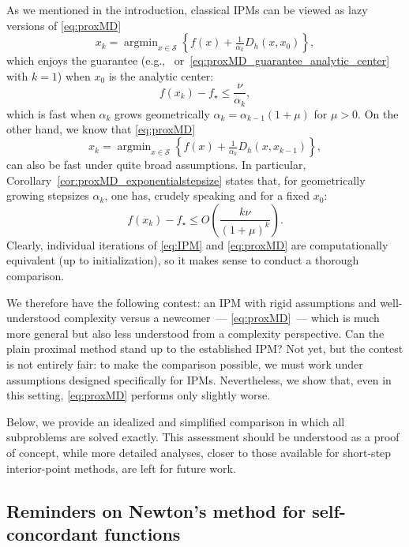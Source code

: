 \documentclass[a4paper]{article}
\renewcommand{\leq}{\leqslant}
\renewcommand{\SS}{\mathcal{S}}
\DeclareMathOperator*{\argmin}{argmin}
\begin{document}
As we mentioned in the introduction, classical IPMs can be viewed as lazy versions of \eqref{eq:proxMD}
\begin{equation}\tag{IPM}
x_{k} = \argmin_{x\in\SS}\left\{ f(x) + \tfrac{1}{\alpha_k} D_{h}(x,x_0)\right\},
\end{equation}
which enjoys the guarantee (e.g.,~\cite[Theorem 5.3.10]{nesterov2018lectures} or~\eqref{eq:proxMD_guarantee_analytic_center} with $k=1$) when $x_0$ is the analytic center:
\[f(x_k)-f_\star \leq \frac{\nu}{\alpha_k},\]
which is fast when $\alpha_k$ grows geometrically $\alpha_k = \alpha_{k-1}(1+\mu)$ for $\mu>0$.
On the other hand, we  know that \eqref{eq:proxMD} 
\begin{equation}\tag{proxMD}
x_{k} = \argmin_{x\in\SS}\left\{ f(x) + \tfrac{1}{\alpha_k} D_{h}(x,x_{k-1})\right\},
\end{equation}
can also be fast under quite broad assumptions. In particular,
Corollary~\ref{cor:proxMD_exponentialstepsize} states that, for geometrically growing
stepsizes $\alpha_k$, one has, crudely speaking and for a fixed $x_0$:
\begin{equation*}
        f(x_k)-f_\star \leq O\left(\frac{k \nu}{(1+\mu)^k}\right).
\end{equation*}
Clearly, individual iterations of \eqref{eq:IPM} and \eqref{eq:proxMD} are computationally equivalent (up to initialization), so it makes sense to conduct a thorough  comparison. 

We therefore have the following contest: an IPM with rigid assumptions and well-understood complexity versus a newcomer~--- \eqref{eq:proxMD}~--- which is much more general but also less understood from a complexity perspective. Can the plain proximal method stand up to the established IPM? Not yet, but the contest is not entirely fair: to make the comparison possible, we must work under assumptions designed specifically for IPMs. Nevertheless, we show that, even in this setting, \eqref{eq:proxMD} performs only slightly worse.

Below, we provide an idealized and simplified comparison in which all subproblems are solved exactly. This assessment should be understood as a proof of concept, while more detailed analyses, closer to those available for short-step interior-point methods, are left for future work.

\subsection{Reminders on Newton's method for self-concordant functions}
\end{document}
